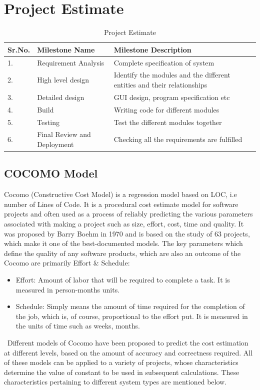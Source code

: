 \documentclass[oneside,a4paper,12pt]{report}
\begin{document}
\section{Project Estimate}
{\renewcommand{\arraystretch}{2}%
	\begin{table}[!htbp]
   
				\begin{tabular}{ |p{1cm}|p{4cm}|p{6cm}|  }
 \hline
 Sr.No. & Milestone Name & Milestone Description\\ 
 \hline
 1. & Requirement Analysis & Complete specification of system \\ 
 \hline
2. & High level design & Identify the modules and the different  entities and their relationships\\
 \hline
 3. & Detailed design & GUI design, program specification etc \\ 
 \hline
4. & Build & Writing code for different modules\\
\hline
5.	& Testing  & Test the different modules together  \\
\hline
6. & Final Review and Deployment & Checking all the requirements are fulfilled \\
\hline
\end{tabular}
\caption{Project Estimate}
	\label{tab:hreq}
\end{table}
\subsection{COCOMO Model}
Cocomo (Constructive Cost Model) is a regression model based on LOC, i.e number of Lines of Code. It is a procedural cost estimate model for software projects and often used as a process of reliably predicting the various parameters associated with making a project such as size, effort, cost, time and quality. It was proposed by Barry Boehm in 1970 and is based on the study of 63 projects, which make it one of the best-documented models. The key parameters which define the quality of any software products, which are also an outcome of the Cocomo are primarily Effort \& Schedule:
\begin{itemize}
\item Effort: Amount of labor that will be required to complete a task. It is measured in person-months units.\
\item Schedule: Simply means the amount of time required for the completion of the job, which is, of course, proportional to the effort put. It is measured in the units of time such as weeks, months.\\
\end{itemize}
\
Different models of Cocomo have been proposed to predict the cost estimation at different levels, based on the amount of accuracy and correctness required. All of these models can be applied to a variety of projects, whose characteristics determine the value of constant to be used in subsequent calculations. These characteristics pertaining to different system types are mentioned below.\\

}
\end{document}

